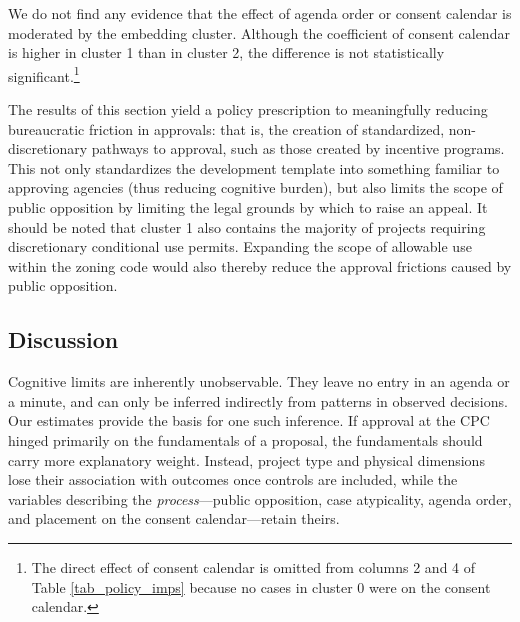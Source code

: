 We do not find any evidence that the effect of agenda order or consent calendar is moderated by the embedding cluster. Although the coefficient of consent calendar is higher in cluster 1 than in cluster 2, the difference is not statistically significant.\footnote{The direct effect of consent calendar is omitted from columns 2 and 4 of Table \ref{tab_policy_imps} because no cases in cluster 0 were on the consent calendar.}

The results of this section yield a policy prescription to meaningfully reducing bureaucratic friction in approvals: that is, the creation of standardized, non-discretionary pathways to approval, such as those created by incentive programs. This not only standardizes the development template into something familiar to approving agencies (thus reducing cognitive burden), but also limits the scope of public opposition by limiting the legal grounds by which to raise an appeal. It should be noted that cluster 1 also contains the majority of projects requiring discretionary conditional use permits. Expanding the scope of allowable use within the zoning code would also thereby reduce the approval frictions caused by public opposition.

\subsection{Discussion}


Cognitive limits are inherently unobservable. They leave no entry in an agenda or a minute, and can only be inferred indirectly from patterns in observed decisions. Our estimates provide the basis for one such inference. If approval at the CPC hinged primarily on the fundamentals of a proposal, the fundamentals should carry more explanatory weight. Instead, project type and physical dimensions lose their association with outcomes once controls are included, while the variables describing the \emph{process}---public opposition, case atypicality, agenda order, and placement on the consent calendar---retain theirs.

